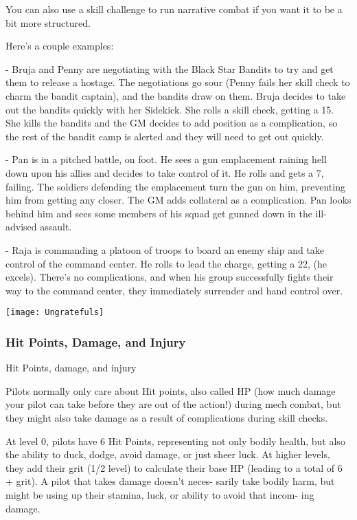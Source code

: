 You can also use a skill challenge to run narrative combat if you want it to be a bit more
structured.


Here’s a couple examples:

	        - Bruja and Penny are negotiating with the Black Star Bandits to try and get them to
release a hostage. The negotiations go sour (Penny fails her skill check to charm the bandit
captain), and the bandits draw on them. Bruja decides to take out the bandits quickly with her
Sidekick. She rolls a skill check, getting a 15. She kills the bandits and the GM decides to add
position as a complication, so the rest of the bandit camp is alerted and they will need to get out
quickly.

	        - Pan is in a pitched battle, on foot. He sees a gun emplacement raining hell down upon
his allies and decides to take control of it. He rolls and gets a 7, failing. The soldiers defending
the emplacement turn the gun on him, preventing him from getting any closer. The GM adds
collateral as a complication. Pan looks behind him and sees some members of his squad get
gunned down in the ill-advised assault.

	        - Raja is commanding a platoon of troops to board an enemy ship and take control of the
command center. He rolls to lead the charge, getting a 22, (he excels). There’s no complications,
and when his group successfully fights their way to the command center, they immediately
surrender and hand control over.
\newpage
\begin{center}
  \texttt{[image: Ungratefuls]}
\end{center}
\subsubsection{Hit Points, Damage, and Injury}

                                 Hit Points, damage, and injury

Pilots normally only care about Hit points, also called HP (how much damage your pilot can take
before they are out of the action!) during mech combat, but they might also take damage as a
result of complications during skill checks.

At level 0, pilots have 6 Hit Points, representing not only bodily health, but also the ability to
duck, dodge, avoid damage, or just sheer luck. At higher levels, they add their grit (1/2 level) to
calculate their base HP (leading to a total of 6 + grit). A pilot that takes damage doesn’t neces-
sarily take bodily harm, but might be using up their stamina, luck, or ability to avoid that incom-
ing damage.

